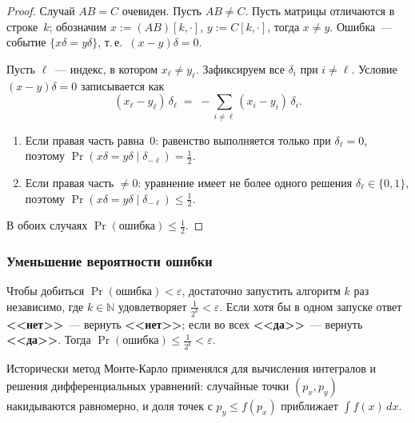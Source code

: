 \begin{proof}
	Случай $AB = C$ очевиден. Пусть $AB \neq C$. Пусть матрицы отличаются в строке~$k$; обозначим $x := (AB)[k,\cdot]$, $y := C[k,\cdot]$, тогда $x \neq y$. Ошибка~--- событие $\{x\delta = y\delta\}$, т.\,е.\ $(x-y)\delta = 0$.
	
	Пусть $\ell$~--- индекс, в котором $x_\ell \neq y_\ell$. Зафиксируем все $\delta_i$ при $i \neq \ell$. Условие $(x-y)\delta = 0$ записывается как
	\[
	(x_\ell - y_\ell)\,\delta_\ell \;=\; -\!\sum_{i \neq \ell}(x_i - y_i)\,\delta_i.
	\]
	\begin{enumerate}
		\item Если правая часть равна~$0$: равенство выполняется только при $\delta_\ell = 0$, поэтому $\Pr(x\delta = y\delta \mid \delta_{-\ell}) = \tfrac{1}{2}$.
		\item Если правая часть $\neq 0$: уравнение имеет не более одного решения $\delta_\ell \in \{0,1\}$, поэтому $\Pr(x\delta = y\delta \mid \delta_{-\ell}) \leq \tfrac{1}{2}$.
	\end{enumerate}
	В обоих случаях $\Pr(\text{ошибка}) \leq \tfrac{1}{2}$.
\end{proof}

\subsubsection*{Уменьшение вероятности ошибки}

Чтобы добиться $\Pr(\text{ошибка}) < \varepsilon$, достаточно запустить алгоритм $k$ раз независимо, где $k \in \mathbb{N}$ удовлетворяет $\tfrac{1}{2^k} < \varepsilon$. Если хотя бы в одном запуске ответ \textbf{<<нет>>}~--- вернуть \textbf{<<нет>>}; если во всех \textbf{<<да>>}~--- вернуть \textbf{<<да>>}. Тогда $\Pr(\text{ошибка}) \leq \tfrac{1}{2^k} < \varepsilon$.

\begin{Remark}{}{}
	Исторически метод Монте-Карло применялся для вычисления интегралов и решения дифференциальных уравнений: случайные точки $(p_x, p_y)$ накидываются равномерно, и доля точек с $p_y \leq f(p_x)$ приближает $\int f(x)\,dx$.
\end{Remark}

